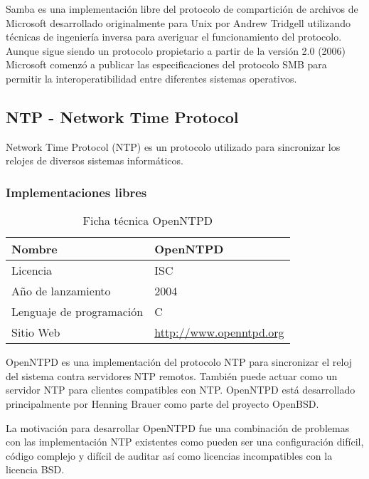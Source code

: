 Samba es una implementación libre del protocolo de compartición de archivos de Microsoft desarrollado originalmente para Unix por Andrew Tridgell utilizando técnicas de ingeniería inversa para averiguar el funcionamiento del protocolo. Aunque sigue siendo un protocolo propietario a partir de la versión 2.0 (2006) Microsoft comenzó a publicar las especificaciones del protocolo SMB para permitir la interoperatibilidad entre diferentes sistemas operativos.


\subsection {NTP - Network Time Protocol}

Network Time Protocol (NTP) es un protocolo utilizado para sincronizar los relojes de diversos sistemas informáticos.

\subsubsection {Implementaciones libres}

\begin{table}[H]
\begin{tabular}{|l|l|}
\hline
Nombre                   & OpenNTPD                       \\ \hline
Licencia                 & ISC                            \\ \hline
Año de lanzamiento       & 2004                           \\ \hline
Lenguaje de programación & C                              \\ \hline
Sitio Web                & \url{http://www.openntpd.org}  \\ \hline
\end{tabular}
\caption{Ficha técnica OpenNTPD}
\end{table}

OpenNTPD es una implementación del protocolo NTP para sincronizar el reloj del sistema contra servidores NTP remotos. También puede actuar como un servidor NTP para clientes compatibles con NTP. OpenNTPD está desarrollado principalmente por Henning Brauer como parte del proyecto OpenBSD.

\bigskip
La motivación para desarrollar OpenNTPD fue una combinación de problemas con las implementación NTP existentes como pueden ser una configuración difícil, código complejo y difícil de auditar así como licencias incompatibles con la licencia BSD.


